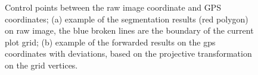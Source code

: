 \begin{figure}[htb!]
  \begin{center}
  \end{center}
  \caption[Control points between the raw image coordinate and GPS coordinates]{
    Control points between the raw image coordinate and GPS coordinates; (a) example of the segmentation results (red polygon) on raw image, the blue broken lines are the boundary of the current plot grid; (b) example of the forwarded results on the \gls{gps} coordinates with deviations, based on the projective transformation on the grid vertices.
  }
  \label{fig:xrs2}
\end{figure}